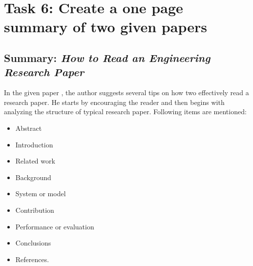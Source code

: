\documentclass{article}
\begin{document}
  \section*{Task 6: Create a one page summary of two given papers}
  \subsection*{Summary: \emph{How to Read an Engineering Research Paper}}
  
  In the given paper \cite{Griswold2009}, the author suggests several tips on how two
  effectively read a research paper. He starts by encouraging the reader and then begins with analyzing  
  the structure of typical research paper. Following items are mentioned:
  \begin{itemize}
    \item Abstract
    \item Introduction
    \item Related work 
    \item Background
    \item System or model
    \item Contribution
    \item Performance or evaluation
    \item Conclusions
    \item References.
  \end{itemize}
\end{document}
